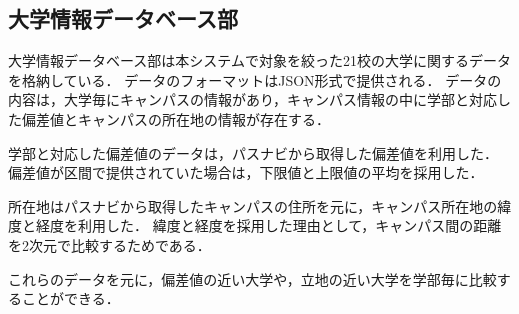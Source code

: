 \subsection{大学情報データベース部}
大学情報データベース部は本システムで対象を絞った21校の大学に関するデータを格納している．
データのフォーマットはJSON形式で提供される．
データの内容は，大学毎にキャンパスの情報があり，キャンパス情報の中に学部と対応した偏差値とキャンパスの所在地の情報が存在する．

学部と対応した偏差値のデータは，パスナビから取得した偏差値を利用した．
偏差値が区間で提供されていた場合は，下限値と上限値の平均を採用した．

所在地はパスナビから取得したキャンパスの住所を元に，キャンパス所在地の緯度と経度を利用した．
緯度と経度を採用した理由として，キャンパス間の距離を2次元で比較するためである．

これらのデータを元に，偏差値の近い大学や，立地の近い大学を学部毎に比較することができる．
